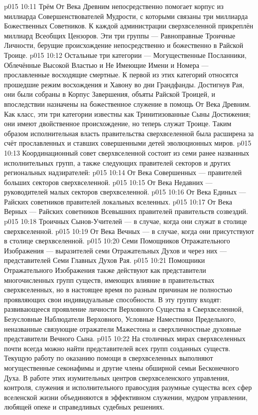 \vs p015 10:11 \pc Трём От Века Древним непосредственно помогает корпус из миллиарда Совершенствователей Мудрости, с которыми связаны три миллиарда Божественных Советников. К каждой администрации сверхвселенной прикреплён миллиард Всеобщих Цензоров. Эти три группы --- Равноправные Троичные Личности, берущие происхождение непосредственно и божественно в Райской Троице.
\vs p015 10:12 Остальные три категории --- Могущественные Посланники, Облечённые Высокой Властью и Не Имеющие Имени и Номера --- прославленные восходящие смертные. К первой из этих категорий относятся прошедшие режим восхождения и Хавону во дни Грандфанды. Достигнув Рая, они были собраны в Корпус Завершения, объяты Райской Троицей, и впоследствии назначены на божественное служение в помощь От Века Древним. Как класс, эти три категории известны как Тринитизованные Сыны Достижения; они имеют двойственное происхождение, но теперь служат Троице. Таким образом исполнительная власть правительства сверхвселенной была расширена за счёт прославленных и ставших совершенными детей эволюционных миров.
\vs p015 10:13 Координационный совет сверхвселенной состоит из семи ранее названных исполнительных групп, а также следующих правителей секторов и других региональных надзирателей:
\vs p015 10:14 От Века Совершенных --- правителей больших секторов сверхвселенной.
\vs p015 10:15 От Века Недавних --- руководителей малых секторов сверхвселенной.
\vs p015 10:16 От Века Единых --- Райских советников правителей локальных вселенных.
\vs p015 10:17 От Века Верных --- Райских советников Всевышних правителей правительств созвездий.
\vs p015 10:18 Троичных Сынов\hyp{}Учителей --- в случае, когда они служат в столице сверхвселенной.
\vs p015 10:19 От Века Вечных --- в случае, когда они присутствуют в столице сверхвселенной.
\vs p015 10:20 Семи Помощников Отражательного Изображения --- выразителей семи Отражательных Духов и через них --- представителей Семи Главных Духов Рая.
\vs p015 10:21 \pc Помощники Отражательного Изображения также действуют как представители многочисленных групп существ, имеющих влияние в правительствах сверхвселенных, но в настоящее время по разным причинам не полностью проявляющих свои индивидуальные способности. В эту группу входят: развивающееся проявление личности Верховного Существа в Сверхвселенной, Безусловные Наблюдатели Верховного, Условные Наместники Предельного, неназванные связующие отражатели Мажестона и сверхличностные духовные представители Вечного Сына.
\vs p015 10:22 \pc На столичных мирах сверхвселенных почти всегда можно найти представителей всех групп созданных существ. Текущую работу по оказанию помощи в сверхвселенных выполняют могущественные секонафимы и другие члены обширной семьи Бесконечного Духа. В работе этих изумительных центров сверхвселенского управления, контроля, служения и исполнительного правосудия разумные существа всех сфер вселенской жизни объединяются в эффективном служении, мудром управлении, любящей опеке и справедливых судебных решениях.
